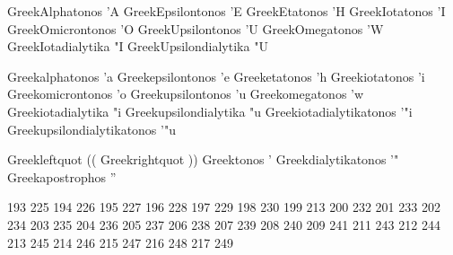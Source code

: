 %
%

 GreekAlphatonos        {'A}
 GreekEpsilontonos      {'E}
 GreekEtatonos          {'H}
 GreekIotatonos         {'I}
 GreekOmicrontonos      {'O}
 GreekUpsilontonos      {'U}
 GreekOmegatonos        {'W}
 GreekIotadialytika     {"I}
 GreekUpsilondialytika  {"U}

%
%

 Greekalphatonos             {'a}
 Greekepsilontonos           {'e}
 Greeketatonos               {'h}
 Greekiotatonos              {'i}
 Greekomicrontonos           {'o}
 Greekupsilontonos           {'u}
 Greekomegatonos             {'w}
 Greekiotadialytika          {"i}
 Greekupsilondialytika       {"u}
 Greekiotadialytikatonos     {'"i}
 Greekupsilondialytikatonos  {'"u}

%
%

 Greekleftquot               {((}
 Greekrightquot              {))}
 Greektonos                  {'}
 Greekdialytikatonos         {'"}
 Greekapostrophos            {''}

\stopencoding 


\startmapping[iso-8859-7]

%
% 

 193 225 %
 194 226 %
 195 227 %
 196 228 %
 197 229 %
 198 230 %
 199 213 %
 200 232 %
 201 233 %
 202 234 %
 203 235 %
 204 236 %
 205 237 %
 206 238 %
 207 239 %
 208 240 %
 209 241 %
 211 243 %
 212 244 %
 213 245 %
 214 246 %
 215 247 %
 216 248 %
 217 249 %

